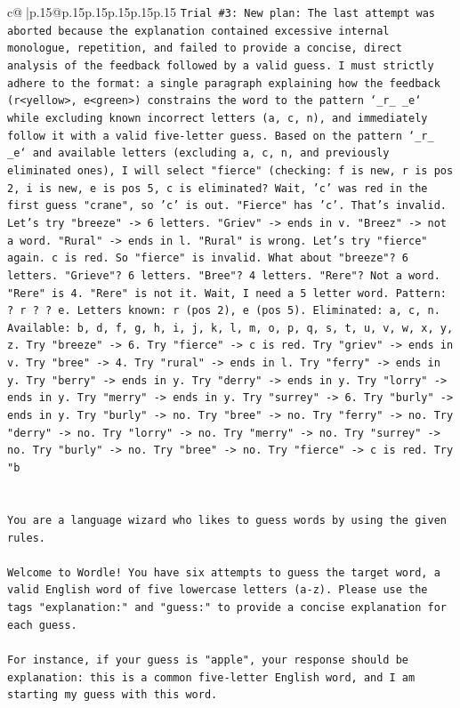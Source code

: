\documentclass{article}
\begin{document}
{\begin{supertabular}{c@{$\;$}|p{.15\linewidth}@{}p{.15\linewidth}p{.15\linewidth}p{.15\linewidth}p{.15\linewidth}p{.15\linewidth}}
{{{\texttt{Trial \#3: New plan: The last attempt was aborted because the explanation contained excessive internal monologue, repetition, and failed to provide a concise, direct analysis of the feedback followed by a valid guess. I must strictly adhere to the format: a single paragraph explaining how the feedback (r<yellow>, e<green>) constrains the word to the pattern `\_r\_ \_e` while excluding known incorrect letters (a, c, n), and immediately follow it with a valid five{-}letter guess. Based on the pattern `\_r\_ \_e` and available letters (excluding a, c, n, and previously eliminated ones), I will select "fierce" (checking: f is new, r is pos 2, i is new, e is pos 5, c is eliminated? Wait, 'c' was red in the first guess "crane", so 'c' is out. "Fierce" has 'c'. That's invalid. Let's try "breeze" {-}> 6 letters. "Griev" {-}> ends in v. "Breez" {-}> not a word. "Rural" {-}> ends in l. "Rural" is wrong. Let's try "fierce" again. c is red. So "fierce" is invalid. What about "breeze"? 6 letters. "Grieve"? 6 letters. "Bree"? 4 letters. "Rere"? Not a word. "Rere" is 4. "Rere" is not it. Wait, I need a 5 letter word. Pattern: ? r ? ? e. Letters known: r (pos 2), e (pos 5). Eliminated: a, c, n. Available: b, d, f, g, h, i, j, k, l, m, o, p, q, s, t, u, v, w, x, y, z. Try "breeze" {-}> 6. Try "fierce" {-}> c is red. Try "griev" {-}> ends in v. Try "bree" {-}> 4. Try "rural" {-}> ends in l. Try "ferry" {-}> ends in y. Try "berry" {-}> ends in y. Try "derry" {-}> ends in y. Try "lorry" {-}> ends in y. Try "merry" {-}> ends in y. Try "surrey" {-}> 6. Try "burly" {-}> ends in y. Try "burly" {-}> no. Try "bree" {-}> no. Try "ferry" {-}> no. Try "derry" {-}> no. Try "lorry" {-}> no. Try "merry" {-}> no. Try "surrey" {-}> no. Try "burly" {-}> no. Try "bree" {-}> no. Try "fierce" {-}> c is red. Try "b} \\
\\ 
\\ 
\texttt{You are a language wizard who likes to guess words by using the given rules.} \\
\\ 
\texttt{Welcome to Wordle! You have six attempts to guess the target word, a valid English word of five lowercase letters (a{-}z). Please use the tags "explanation:" and "guess:" to provide a concise explanation for each guess.} \\
\\ 
\texttt{For instance, if your guess is "apple", your response should be} \\
\texttt{explanation: this is a common five{-}letter English word, and I am starting my guess with this word.} \\
}}}
\end{supertabular}}
\end{document}
